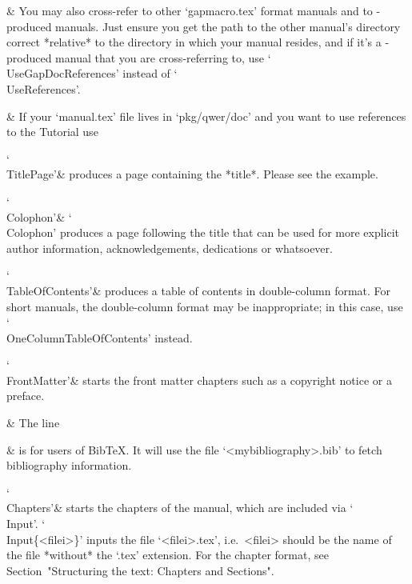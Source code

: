   &
You  may  also  cross-refer to other `gapmacro.tex' format manuals and to
-produced manuals. Just ensure you get the  path  to  the
other manual's directory correct *relative* to  the  directory  in  which
your manual resides, and if it's a -produced manual  that
you  are  cross-referring  to,  use  `\\UseGapDocReferences'  instead  of
`\\UseReferences'.

  &
If your `manual.tex' file lives in `pkg/qwer/doc' and  you  want  to  use
references to the {\GAP} Tutorial use

\begintt
{}
\endtt

\indextt{\\TitlePage}
`\\TitlePage'&
produces a page containing the *title*. Please see the example.

\indextt{\\Colophon}
`\\Colophon'&
`\\Colophon' produces a page following the title that  can  be  used  for
more  explicit  author  information,  acknowledgements,  dedications   or
whatsoever.

\indextt{\\TableOfContents}\indextt{\\OneColumnTableOfContents}
`\\TableOfContents'&
produces a table of contents in double-column format. For short  manuals,
the  double-column  format  may  be  inappropriate;  in  this  case,  use
`\\OneColumnTableOfContents' instead.

\indextt{\\FrontMatter}
`\\FrontMatter'&
starts the front matter chapters such as a copyright notice or a preface.

  &
The line

{}

  &
is for users of Bib{\TeX}. It will use the file `<mybibliography>.bib' to
fetch bibliography information.

\indextt{\\Chapters}
`\\Chapters'&
starts the chapters of the manual,  which  are  included  via  `\\Input'.
`\\Input\{<filei>\}' inputs the file `<filei>.tex',  i.e.~<filei>  should
be the name of the file *without* the `.tex' extension. For  the  chapter
format, see Section~"Structuring the text: Chapters and Sections".

